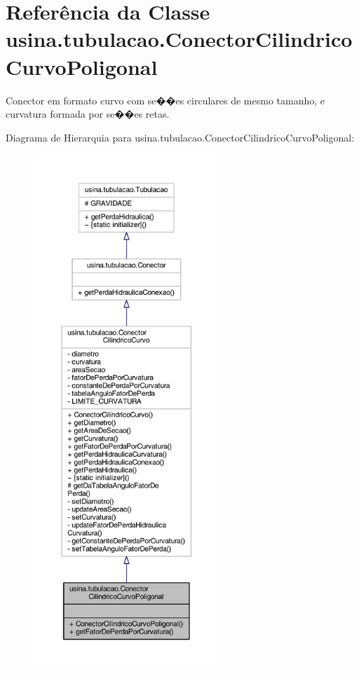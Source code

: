 \hypertarget{classusina_1_1tubulacao_1_1_conector_cilindrico_curvo_poligonal}{\section{Referência da Classe usina.\-tubulacao.\-Conector\-Cilindrico\-Curvo\-Poligonal}
\label{classusina_1_1tubulacao_1_1_conector_cilindrico_curvo_poligonal}
}


{\ttfamily Conector} em formato curvo com se��es circulares de mesmo tamanho, e curvatura formada por se��es retas.  




Diagrama de Hierarquia para usina.\-tubulacao.\-Conector\-Cilindrico\-Curvo\-Poligonal\-:
\nopagebreak
\begin{figure}[H]
\begin{center}
\leavevmode
\includegraphics[height=550pt]{classusina_1_1tubulacao_1_1_conector_cilindrico_curvo_poligonal__inherit__graph}
\end{center}
\end{figure}


